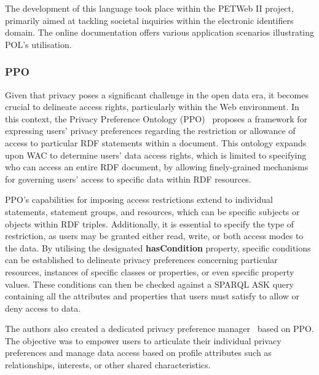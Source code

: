 The development of this language took place within the PETWeb II project, primarily aimed at tackling societal inquiries within the electronic identifiers domain.
The online documentation offers various application scenarios illustrating POL's utilisation.

\subsubsection{PPO}
\label{sec:ppo}

Given that privacy poses a significant challenge in the open data era, it becomes crucial to delineate access rights, particularly within the Web environment.
In this context, the Privacy Preference Ontology (PPO)~\citep{sacco_privacy_2011} proposes a framework for expressing users' privacy preferences regarding the restriction or allowance of access to particular RDF statements within a document.
This ontology expands upon WAC to determine users' data access rights, which is limited to specifying who can access an entire RDF document, by allowing finely-grained mechanisms for governing users' access to specific data within RDF resources.

PPO's capabilities for imposing access restrictions extend to individual statements, statement groups, and resources, which can be specific subjects or objects within RDF triples. 
Additionally, it is essential to specify the type of restriction, as users may be granted either read, write, or both access modes to the data.
By utilising the designated \textbf{hasCondition} property, specific conditions can be established to delineate privacy preferences concerning particular resources, instances of specific classes or properties, or even specific property values.
These conditions can then be checked against a SPARQL ASK query containing all the attributes and properties that users must satisfy to allow or deny access to data.

The authors also created a dedicated privacy preference manager~\citep{sacco_privacy_2011b} based on PPO.
The objective was to empower users to articulate their individual privacy preferences and manage data access based on profile attributes such as relationships, interests, or other shared characteristics.

